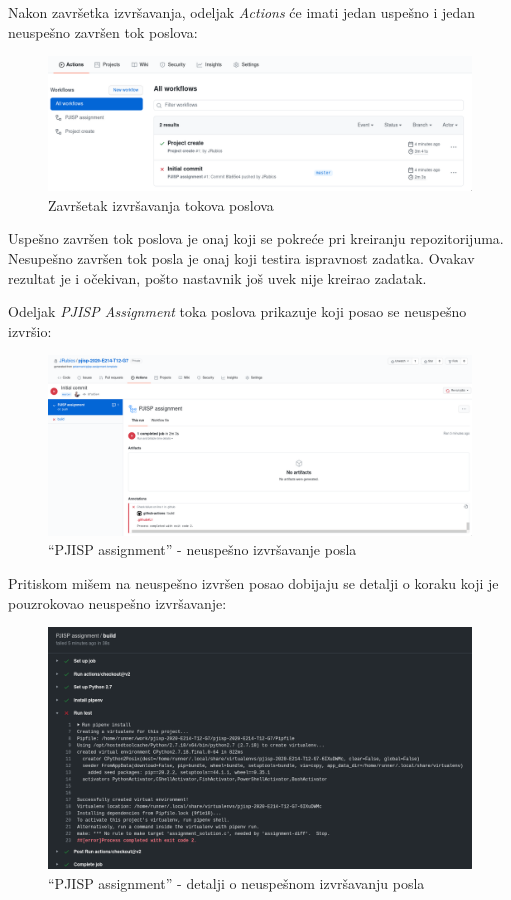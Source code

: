 \documentclass[12pt]{report}
\begin{document}
Nakon završetka izvršavanja, odeljak \textit{Actions} će imati jedan uspešno i jedan neuspešno završen tok poslova:

\begin{figure}[H]
    \centering
    \includegraphics[width=\linewidth]{images/9.png}
    \caption{Završetak izvršavanja tokova poslova}
\end{figure}

Uspešno završen tok poslova je onaj koji se pokreće pri kreiranju repozitorijuma. Nesupešno završen tok posla je onaj koji testira ispravnost zadatka. Ovakav rezultat je i očekivan, pošto nastavnik još uvek nije kreirao zadatak.

Odeljak \textit{PJISP Assignment} toka poslova prikazuje koji posao se neuspešno izvršio:

\begin{figure}[H]
    \centering
    \includegraphics[width=\linewidth]{images/10.png}
    \caption{``PJISP assignment'' - neuspešno izvršavanje posla}
\end{figure}

Pritiskom mišem na neuspešno izvršen posao dobijaju se detalji o koraku koji je pouzrokovao neuspešno izvršavanje:

\begin{figure}[H]
    \centering
    \includegraphics[width=\linewidth]{images/11.png}
    \caption{``PJISP assignment'' - detalji o neuspešnom izvršavanju posla}
\end{figure}
\end{document}
